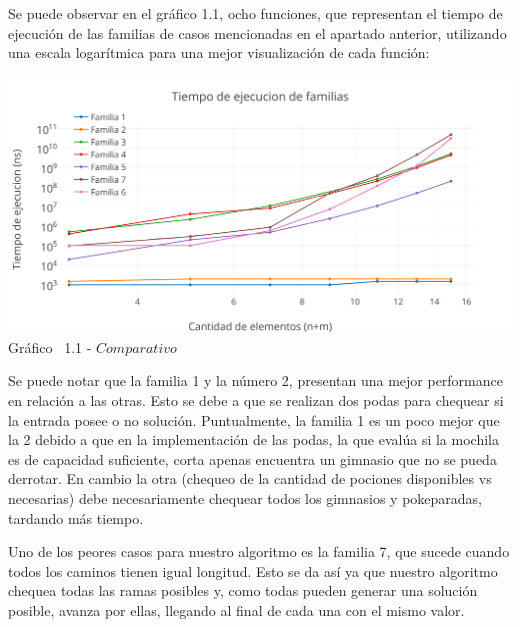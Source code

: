 Se puede observar en el  gráfico 1.1, ocho funciones, que representan el tiempo de ejecuci\'on de las familias de casos mencionadas en el apartado anterior, utilizando una escala logar\'itmica para una mejor visualizaci\'on de cada funci\'on:\\


\vspace*{0.3cm} \vspace*{0.3cm}
  \begin{center}
 \includegraphics[scale=0.65]{./EJ1/comparativo.png}
 {Gr\'afico \ 1.1 - $Comparativo$}
  \end{center}
  \vspace*{0.3cm}
  
Se puede notar que la familia 1 y la n\'umero 2, presentan una mejor performance en relaci\'on a las otras. Esto se debe a que se realizan dos podas para chequear si la entrada posee o no soluci\'on. Puntualmente, la familia 1 es un poco mejor que la 2 debido a que en la implementaci\'on de las podas, la que evalúa si la mochila es de capacidad suficiente, corta apenas encuentra un gimnasio que no se pueda derrotar. En cambio la otra (chequeo de la cantidad de pociones disponibles vs necesarias) debe necesariamente chequear todos los gimnasios y pokeparadas, tardando más tiempo.

Uno de los peores casos para nuestro algoritmo es la familia 7, que sucede cuando todos los caminos tienen igual longitud. Esto se da as\'i ya que nuestro algoritmo chequea todas las ramas posibles y, como todas pueden generar una soluci\'on posible, avanza por ellas, llegando al final de cada una con el mismo valor.\\

